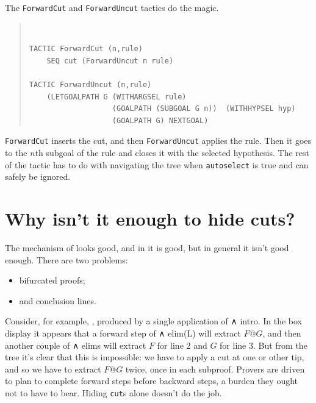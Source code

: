 \documentclass[11pt]{article}
\newenvironment{japeish}{\begin{quote}\tt\small}{\end{quote}}
\newcommand{\textj}[1]{{\tt\small{#1}}}
\begin{document}
The \textj{ForwardCut} and \textj{ForwardUncut} tactics do the magic.
\begin{japeish}
\begin{verbatim}
TACTIC ForwardCut (n,rule)
    SEQ cut (ForwardUncut n rule)

TACTIC ForwardUncut (n,rule)
    (LETGOALPATH G (WITHARGSEL rule) 
                   (GOALPATH (SUBGOAL G n))  (WITHHYPSEL hyp) 
                   (GOALPATH G) NEXTGOAL)

\end{verbatim}
\end{japeish}
\textj{ForwardCut} inserts the cut, and then \textj{ForwardUncut} applies the rule. Then it goes to the $n$th subgoal of the rule and closes it with the selected hypothesis. The rest of the tactic has to do with navigating the tree when \textj{autoselect} is true and can safely be ignored.

\section{Why isn't it enough to hide cuts?}

The mechanism of  looks good, and in  it is good, but in general it isn't good enough. There are two problems: 
\begin{itemize}
\item bifurcated proofs; 
\item and conclusion lines.
\end{itemize}

Consider, for example, , produced by a single application of ∧ intro. In the box display it appears that a forward step of ∧ elim(L) will extract $F@G$, and then another couple of ∧ elims will extract $F$ for line 2 and $G$ for line 3. But from the tree it's clear that this is impossible: we have to apply a cut at one or other tip, and so we have to extract $F@G$ twice, once in each subproof. Provers are driven to plan to complete forward steps before backward steps, a burden they ought not to have to bear. Hiding \textj{cut}s alone doesn't do the job. 
\end{document}
